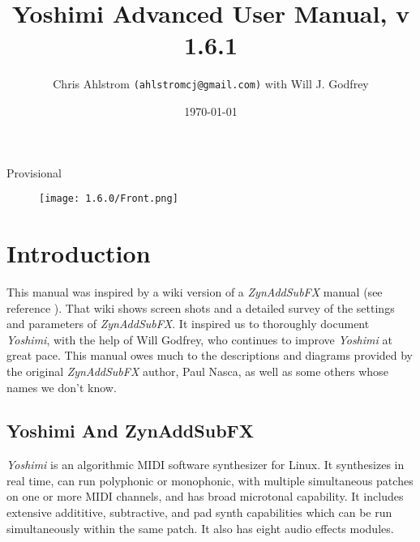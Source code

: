 \documentclass[
 11pt,
 twoside,
 a4paper,
 final                                 %
]{article}
\begin{document}
\title{Yoshimi Advanced User Manual, v 1.6.1}
\author{Chris Ahlstrom \texttt{(ahlstromcj@gmail.com)} with Will J. Godfrey}
\date{\today}
\maketitle
Provisional
\begin{figure}[H]
   \centering
   \texttt{[image: 1.6.0/Front.png]}
\end{figure}

\clearpage                             %

\tableofcontents
\listoffigures                         %
\listoftables                          %

%

\setlength{\parindent}{2em}
\setlength{\parskip}{1ex plus 0.5ex minus 0.2ex}

\section{Introduction}
\label{sec:introduction}

   This manual was inspired by a wiki version of a
   \textsl{ZynAddSubFX} manual (see reference \cite{zynwiki}).  That wiki
   shows screen shots and a
   detailed survey of the settings and parameters of \textsl{ZynAddSubFX}.  It
   inspired us to thoroughly document \textsl{Yoshimi}, with the help of
   Will Godfrey, who continues to improve \textsl{Yoshimi} at great pace.
   This manual owes much to the descriptions and diagrams provided by the
   original \textsl{ZynAddSubFX} author, Paul Nasca, as well as some others
   whose names we don't know.

\subsection{Yoshimi And ZynAddSubFX}
\label{subsec:introduction_yoshimi_vs_zyn}

   \textsl{Yoshimi} is an algorithmic MIDI software synthesizer for Linux.
   It synthesizes in real time, can run polyphonic or monophonic, with multiple
   simultaneous patches on one or more MIDI channels, and has broad microtonal
   capability. It includes extensive addititive, subtractive,
   and pad synth capabilities which can be run simultaneously within the
   same patch.  It also has eight audio effects modules.
\end{document}
